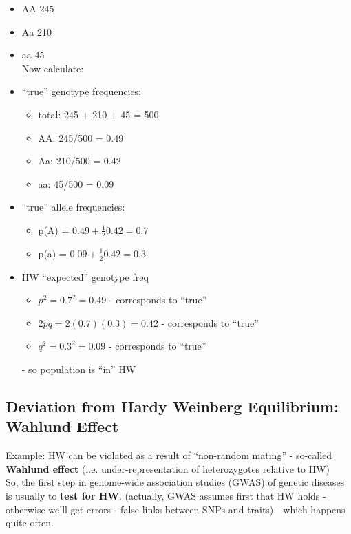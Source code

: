 \documentclass{scrartcl}
\begin{document}
\begin{itemize}
\item AA 245
\item Aa 210
\item aa 45\\
Now calculate:
\item ``true'' genotype frequencies:
  \begin{itemize}
  \item total: 245 + 210 + 45 = 500
  \item AA: 245/500 = 0.49
  \item Aa: 210/500 = 0.42
  \item aa: 45/500 = 0.09
  \end{itemize}
\item ``true'' allele frequencies:
  \begin{itemize}
  \item p(A) = $0.49 + \frac12 0.42 = 0.7$
  \item p(a) = $0.09 + \frac12 0.42 = 0.3$
  \end{itemize}
\item HW ``expected'' genotype freq
  \begin{itemize}
  \item $p^2 = 0.7^2 = 0.49$ - corresponds to ``true''
  \item $2pq = 2(0.7)(0.3) = 0.42$ - corresponds to ``true''
  \item $q^2 = 0.3^2 = 0.09$ - corresponds to ``true''
  \end{itemize} - so population is ``in'' HW
\end{itemize}
\subsection{Deviation from Hardy Weinberg Equilibrium: Wahlund Effect}
\label{sec:6-3}
Example: HW can be violated as a result of ``non-random mating'' - so-called {\bf Wahlund effect} (i.e. under-representation of heterozygotes relative to HW)\\
So, the first step in genome-wide association studies (GWAS) of genetic diseases is usually to {\bf test for HW}. 
(actually, GWAS assumes first that HW holds - otherwise we'll get errors - false links between SNPs and traits) - which happens quite often.

\end{document}
